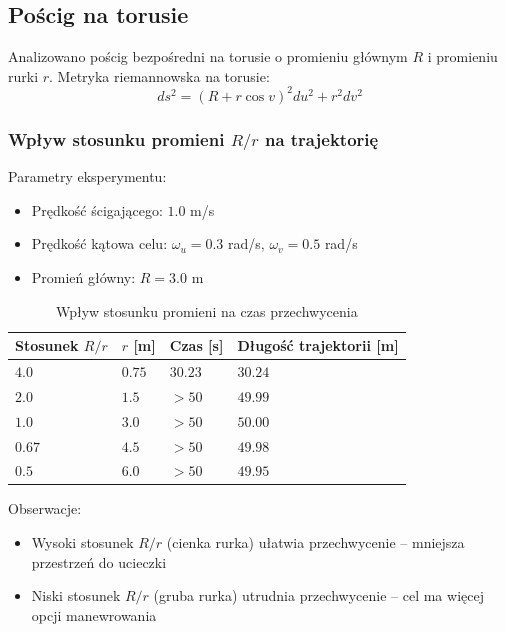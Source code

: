 \documentclass[12pt,a4paper]{article}
\begin{document}
\subsection{Pościg na torusie}

Analizowano pościg bezpośredni na torusie o promieniu głównym $R$ i promieniu rurki $r$. Metryka riemannowska na torusie:
\begin{equation}
ds^2 = (R + r\cos v)^2 du^2 + r^2 dv^2
\end{equation}

\subsubsection{Wpływ stosunku promieni $R/r$ na trajektorię}

Parametry eksperymentu:
\begin{itemize}
    \item Prędkość ścigającego: $1.0$ m/s
    \item Prędkość kątowa celu: $\omega_u = 0.3$ rad/s, $\omega_v = 0.5$ rad/s
    \item Promień główny: $R = 3.0$ m
\end{itemize}

\begin{table}[H]
\centering
\caption{Wpływ stosunku promieni na czas przechwycenia}
\label{tab:torus_ratio_analysis}
\begin{tabular}{@{}llll@{}}
\toprule
\textbf{Stosunek $R/r$} & \textbf{$r$ [m]} & \textbf{Czas [s]} & \textbf{Długość trajektorii [m]} \\ \midrule
$4.0$ & $0.75$ & $30.23$ & $30.24$ \\
$2.0$ & $1.5$ & $>50$ & $49.99$ \\
$1.0$ & $3.0$ & $>50$ & $50.00$ \\
$0.67$ & $4.5$ & $>50$ & $49.98$ \\
$0.5$ & $6.0$ & $>50$ & $49.95$ \\ \bottomrule
\end{tabular}
\end{table}

Obserwacje:
\begin{itemize}
    \item Wysoki stosunek $R/r$ (cienka rurka) ułatwia przechwycenie -- mniejsza przestrzeń do ucieczki
    \item Niski stosunek $R/r$ (gruba rurka) utrudnia przechwycenie -- cel ma więcej opcji manewrowania
\end{itemize}
\end{document}
